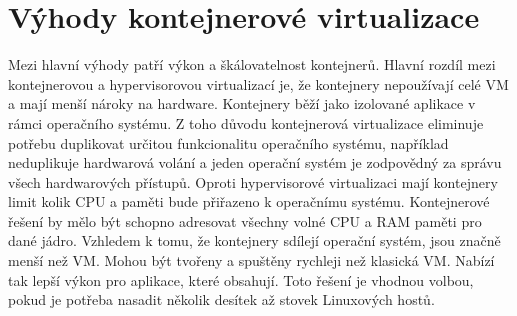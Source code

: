 \section{Výhody kontejnerové virtualizace}
Mezi hlavní výhody patří výkon a škálovatelnost kontejnerů. Hlavní rozdíl mezi kontejnerovou a hypervisorovou virtualizací je, že kontejnery nepoužívají celé VM a mají menší nároky na hardware. Kontejnery běží jako izolované aplikace v rámci operačního systému. Z toho důvodu kontejnerová virtualizace eliminuje potřebu duplikovat určitou funkcionalitu operačního systému, například neduplikuje hardwarová volání a jeden operační systém je zodpovědný za správu všech hardwarových přístupů.
Oproti hypervisorové virtualizaci mají kontejnery limit kolik CPU a paměti bude přiřazeno k operačnímu systému. Kontejnerové řešení by mělo být schopno adresovat všechny volné CPU a RAM paměti pro dané jádro. Vzhledem k tomu, že kontejnery sdílejí operační systém, jsou značně menší než VM. Mohou být tvořeny a spuštěny rychleji než klasická VM. Nabízí tak lepší výkon pro aplikace, které obsahují. Toto řešení je vhodnou volbou, pokud je potřeba nasadit několik desítek až stovek Linuxových hostů.
